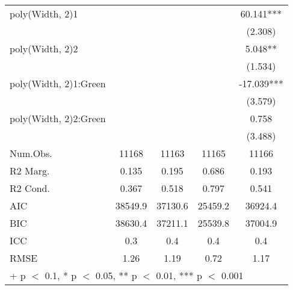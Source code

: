 \begin{table}
\begin{tabular}[t]{lcccc}
poly(Width, 2)1 &  &  &  & 60.141***\\
 &  &  &  & (2.308)\\
poly(Width, 2)2 &  &  &  & 5.048**\\
 &  &  &  & (1.534)\\
poly(Width, 2)1:Green &  &  &  & -17.039***\\
 &  &  &  & (3.579)\\
poly(Width, 2)2:Green &  &  &  & 0.758\\
 &  &  &  & (3.488)\\
\midrule
Num.Obs. & 11168 & 11163 & 11165 & 11166\\
R2 Marg. & 0.135 & 0.195 & 0.686 & 0.193\\
R2 Cond. & 0.367 & 0.518 & 0.797 & 0.541\\
AIC & 38549.9 & 37130.6 & 25459.2 & 36924.4\\
BIC & 38630.4 & 37211.1 & 25539.8 & 37004.9\\
ICC & 0.3 & 0.4 & 0.4 & 0.4\\
RMSE & 1.26 & 1.19 & 0.72 & 1.17\\
\bottomrule
\multicolumn{5}{l}{\rule{0pt}{1em}+ p $<$ 0.1, * p $<$ 0.05, ** p $<$ 0.01, *** p $<$ 0.001}\\
\end{tabular}
\end{table}
